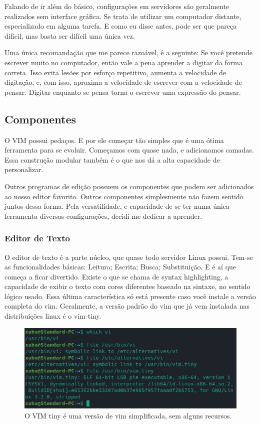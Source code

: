 Falando de ir além do básico, configurações em servidores são geralmente realizados sem interface gráfica.
Se trata de utilizar um computador distante, especializado em alguma tarefa.
E como eu disse antes, pode ser que pareça difícil, mas basta ser difícil uma única vez.

Uma única recomandação que me parece razoável, é a seguinte: Se você pretende escrever muito no computador, então vale a pena
aprender a digitar da forma correta.
Isso evita lesões por esforço repetitivo, aumenta a velocidade de digitação,
e, com isso, aproxima a velocidade de escrever com a velocidade de pensar.
Digitar enquanto se pensa torna o escrever uma expressão do pensar.

\subsection{Componentes}
O VIM possui pedaços.
E por ele começar tão simples que é uma ótima ferramenta para se evoluir.
Começamos com quase nada, e adicionamos camadas.
Essa construção modular também é o que nos dá a alta capacidade de personalizar.

Outros programas de edição possuem os componentes que podem ser adicionados ao nosso editor favorito.
Outros componentes simplesmente não fazem sentido juntos dessa forma.
Pela versatilidade, e capacidade de se ter numa única ferramenta diversas configurações, decidi me dedicar a aprender.

\subsubsection{Editor de Texto}
O editor de texto é a parte núcleo, que quase todo servidor Linux possui.
Tem-se as funcionalidades básicas: Leitura; Escrita; Busca; Substituição.
E é aí que começa a ficar divertido.
Existe o que se chama de syntax highlighting, a capacidade de exibir o texto
com cores diferentes baseado na sintaxe, no sentido lógico usado.
Essa última característica só está presente caso você instale a versão completa do vim.
Geralmente, a versão padrão do vim que já vem instalada nas distribuições linux é o vim-tiny.

\begin{figure}[!h]
\centering
\includegraphics[scale=0.9]{motivacao/VimTiny.jpg}
\caption{O VIM tiny é uma versão de vim simplificada, sem alguns recursos.}
\end{figure}

